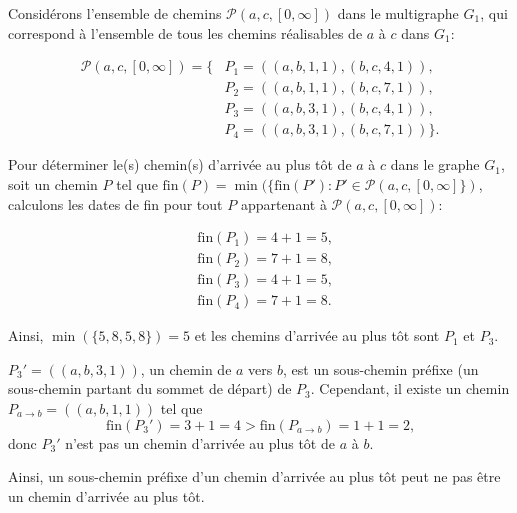 \begin{reponse}
  Considérons l'ensemble de chemins $\mathcal{P}(a,c,[0, \infty])$ dans le
  multigraphe $G_{1}$, qui correspond à l'ensemble de tous les chemins
  réalisables de $a$ à $c$ dans $G_{1}$:

  \begin{equation}
    \begin{align}
      \label{eq:1}
      \mathcal{P}(a,c,[0, \infty]) = \{ & P_1 = ((a,b,1,1), (b,c,4,1)), \\
                                        & P_2 = ((a,b,1,1), (b,c,7,1)), \\
                                        & P_3 = ((a,b,3,1), (b,c,4,1)), \\
                                        & P_4 = ((a,b,3,1), (b,c,7,1)) \}.
    \end{align}
  \end{equation}

  Pour déterminer le(s) chemin(s) d'arrivée au plus tôt de $a$ à $c$ dans le
  graphe $G_{1}$, soit un chemin $P$ tel que
  $\mathrm{fin}(P) = \min(\{\mathrm{fin}(P'): P' \in \mathcal{P}(a,c,[0,
  \infty]\})$, calculons les dates de fin pour tout
  $P$ appartenant à $\mathcal{P}(a,c,[0, \infty])$:

  \begin{equation}
    \begin{align}
      \label{eq:2}
      & \mathrm{fin}(P_1) = 4 + 1 = 5, \\
      & \mathrm{fin}(P_2) = 7 + 1 = 8, \\
      & \mathrm{fin}(P_3) = 4 + 1 = 5, \\
      & \mathrm{fin}(P_4) = 7 + 1 = 8.
    \end{align}
  \end{equation}

  Ainsi, $\min(\{5,8,5,8\}) = 5$ et les chemins d'arrivée au plus tôt sont $P_1$
  et $P_3$.

  $P_{3}' = ((a,b,3,1))$, un chemin de $a$ vers $b$, est un sous-chemin préfixe
  (un sous-chemin partant du sommet de départ) de $P_{3}$. Cependant, il existe
  un chemin $P_{a \rightarrow b} = ((a,b,1,1))$ tel que
  \begin{equation}
    \mathrm{fin}(P_{3}') = 3 + 1 = 4 > \mathrm{fin}(P_{a \rightarrow b}) = 1 + 1
    = 2 \text{,}
  \label{eq:4}
  \end{equation}
  donc $P_{3}'$ n'est pas un chemin d'arrivée au plus tôt de $a$ à $b$.

  Ainsi, un sous-chemin préfixe d'un chemin d'arrivée au plus tôt peut ne pas
  être un chemin d'arrivée au plus tôt.
\end{reponse}

